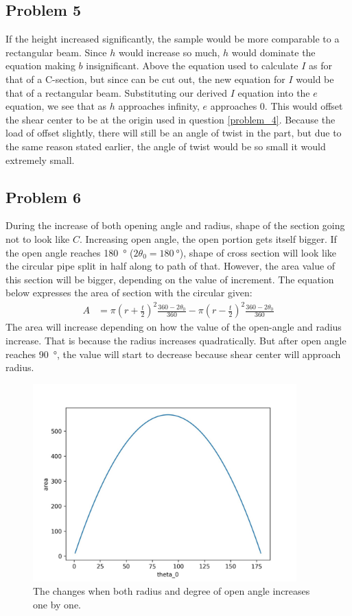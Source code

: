 \documentclass[12 pt]{report}
\begin{document}
\subsection{Problem 5}
If the height increased significantly, the sample would be more comparable to a rectangular beam. Since $h$ would increase so much, $h$ would dominate the equation making $b$ insignificant. Above the equation used to calculate $I$ as for that of a C-section, but since can be cut out, the new equation for $I$ would be that of a rectangular beam. Substituting our derived $I$ equation into the $e$ equation, we see that as $h$ approaches infinity, $e$ approaches \num{0}. This would offset the shear center to be at the origin used in question \ref{problem_4}. Because the load of offset slightly, there will still be an angle of twist in the part, but due to the same reason stated earlier, the angle of twist would be so small it would extremely small.

\subsection{Problem 6}
During the increase of both opening angle and radius, shape of the section going not to look like $C$. Increasing open angle, the open portion gets itself bigger. If the open angle reaches \qty{180}{\degree} ($2\theta_0=\qty{180}{\degree}$), shape of cross section will look like the circular pipe split in half along to path of that. However, the area value of this section will be bigger, depending on the value of increment. The equation below expresses the area of section with the circular given:
\begin{align*}
	A&=\pi\left(r+\frac{t}{2}\right)^2\frac{360-2\theta_0}{360}-\pi\left(r-\frac{t}{2}\right)^2\frac{360-2\theta_0}{360}
\end{align*}
The area will increase depending on how the value of the open-angle and radius increase. That is because the radius increases quadratically. But after open angle reaches \qty{90}{\degree}, the value will start to decrease because shear center will approach radius.

\begin{figure}[htbp]
	\centering
	\includegraphics[width=4in]{images/Graphs/random_graph}
	\caption{The changes when both radius and degree of open angle increases one by one.}
	\label{fig:random_graph}
\end{figure}
\end{document}
